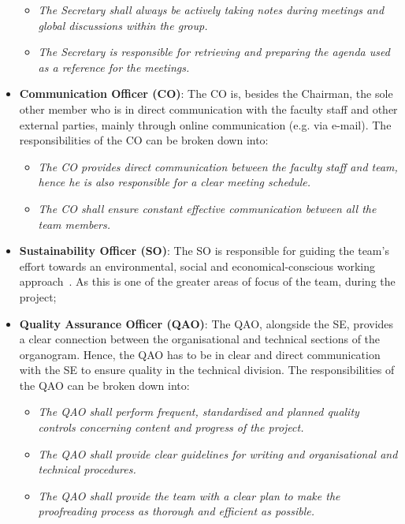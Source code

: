 \begin{itemize}
    \begin{itemize}
        \item \textit{The Secretary shall always be actively taking notes during meetings and global discussions within the group.}
        \item \textit{The Secretary is responsible for retrieving and preparing the agenda used as a reference for the meetings.}
    \end{itemize}
    \item \textbf{Communication Officer (CO)}: The CO is, besides the Chairman, the sole other member who is in direct communication with the faculty staff and other external parties, mainly through online communication (e.g. via e-mail).
    The responsibilities of the CO can be broken down into:
    \begin{itemize}
        \item \textit{The CO provides direct communication between the faculty staff and team, hence he is also responsible for a clear meeting schedule.}
        \item \textit{The CO shall ensure constant effective communication between all the team members.}
    \end{itemize}
    \item \textbf{Sustainability Officer (SO)}: The SO is responsible for guiding the team's effort towards an environmental, social and economical-conscious working approach~\cite{sustofficer}.
    As this is one of the greater areas of focus of the team, during the project;
    \item \textbf{Quality Assurance Officer (QAO)}: The QAO, alongside the SE, provides a clear connection between the organisational and technical sections of the organogram.
    Hence, the QAO has to be in clear and direct communication with the SE to ensure quality in the technical division.
    The responsibilities of the QAO can be broken down into:
    \begin{itemize}
        \item \textit{The QAO shall perform frequent, standardised and planned quality controls concerning content and progress of the project.}
        \item \textit{The QAO shall provide clear guidelines for writing and organisational and technical procedures.}
        \item \textit{The QAO shall provide the team with a clear plan to make the proofreading process as thorough and efficient as possible.}
    \end{itemize}

\end{itemize}
